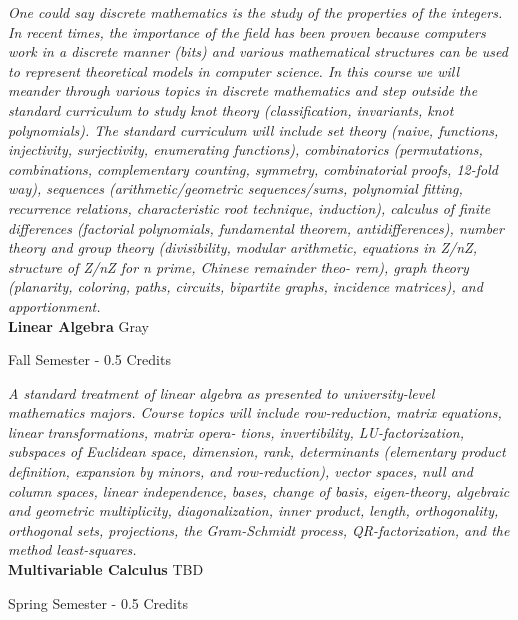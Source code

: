 \vspace{1mm}\emph{One could say discrete mathematics is the study of the properties of the integers. In recent times, the importance of the field has been proven because computers work in a discrete manner (bits) and various mathematical structures can be used to represent theoretical models in computer science. In this course we will meander through various topics in discrete mathematics and step outside the standard curriculum to study knot theory (classification, invariants, knot polynomials). The standard curriculum will include set theory (naive, functions, injectivity, surjectivity, enumerating functions), combinatorics (permutations, combinations, complementary counting, symmetry, combinatorial proofs, 12-fold way), sequences (arithmetic/geometric sequences/sums, polynomial fitting, recurrence relations, characteristic root technique, induction), calculus of finite differences (factorial polynomials, fundamental theorem, antidifferences), number theory and group theory (divisibility, modular arithmetic, equations in Z/nZ, structure of Z/nZ for n prime, Chinese remainder theo- rem), graph theory (planarity, coloring, paths, circuits, bipartite graphs, incidence matrices), and apportionment.}\\


\noindent\textbf{Linear Algebra} \hfill Gray

\noindent Fall Semester - 0.5 Credits

\vspace{1mm}\emph{A standard treatment of linear algebra as presented to university-level mathematics majors. Course topics will include row-reduction, matrix equations, linear transformations, matrix opera- tions, invertibility, LU-factorization, subspaces of Euclidean space, dimension, rank, determinants (elementary product definition, expansion by minors, and row-reduction), vector spaces, null and column spaces, linear independence, bases, change of basis, eigen-theory, algebraic and geometric multiplicity, diagonalization, inner product, length, orthogonality, orthogonal sets, projections, the Gram-Schmidt process, QR-factorization, and the method least-squares.}\\


\noindent\textbf{Multivariable Calculus} \hfill TBD

\noindent Spring Semester - 0.5 Credits

